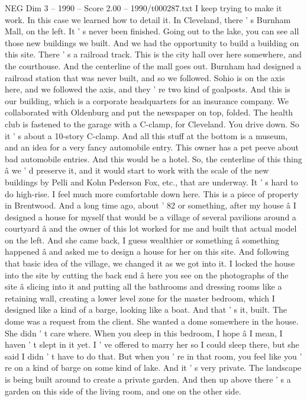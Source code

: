 \begin{textsample}{NEG Dim 3 – 1990 – Score 2.00 – 1990/t000287.txt}
I keep trying to make it work.
In this case we learned how to detail it.
In Cleveland, there ' s Burnham Mall, on the left.
It ' s never been finished.
Going out to the lake, you can see all those new buildings we built.
And we had the opportunity to build a building on this site.
There ' s a railroad track.
This is the city hall over here somewhere, and the courthouse.
And the centerline of the mall goes out.
Burnham had designed a railroad station that was never built, and so we followed.
Sohio is on the axis here, and we followed the axis, and they ' re two kind of goalposts.
And this is our building, which is a corporate headquarters for an insurance company.
We collaborated with Oldenburg and put the newspaper on top, folded.
The health club is fastened to the garage with a C-clamp, for Cleveland.
You drive down.
So it ' s about a 10-story C-clamp.
And all this stuff at the bottom is a museum, and an idea for a very fancy automobile entry.
This owner has a pet peeve about bad automobile entries.
And this would be a hotel.
So, the centerline of this thing â we ' d preserve it, and it would start to work with the scale of the new buildings by Pelli and Kohn Pederson Fox, etc., that are underway.
It ' s hard to do high-rise.
I feel much more comfortable down here.
This is a piece of property in Brentwood.
And a long time ago, about ' 82 or something, after my house â I designed a house for myself that would be a village of several pavilions around a courtyard â and the owner of this lot worked for me and built that actual model on the left.
And she came back, I guess wealthier or something â something happened â and asked me to design a house for her on this site.
And following that basic idea of the village, we changed it as we got into it.
I locked the house into the site by cutting the back end â here you see on the photographs of the site â slicing into it and putting all the bathrooms and dressing rooms like a retaining wall, creating a lower level zone for the master bedroom, which I designed like a kind of a barge, looking like a boat.
And that ' s it, built.
The dome was a request from the client.
She wanted a dome somewhere in the house.
She didn ' t care where.
When you sleep in this bedroom, I hope â I mean, I haven ' t slept in it yet.
I ' ve offered to marry her so I could sleep there, but she said I didn ' t have to do that.
But when you ' re in that room, you feel like you ' re on a kind of barge on some kind of lake.
And it ' s very private.
The landscape is being built around to create a private garden.
And then up above there ' s a garden on this side of the living room, and one on the other side.

\end{textsample}
